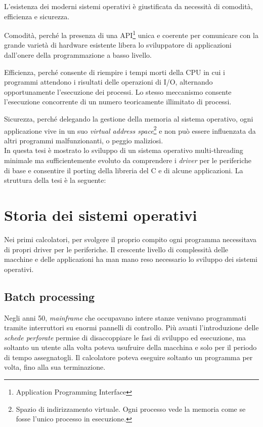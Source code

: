 \documentclass[12pt,a4paper]{report}
\begin{document}
	L'esistenza dei moderni sistemi operativi è giustificata da necessità di comodità, efficienza e sicurezza.
	
	Comodità, perché la presenza di una API\footnote{Application Programming Interface} unica e coerente per comunicare con
	la grande varietà di hardware esistente libera lo sviluppatore di applicazioni dall'onere della programmazione a basso livello.
	
	Efficienza, perché consente di riempire i tempi morti della CPU in cui i programmi attendono i risultati delle operazioni di I/O,
	alternando opportunamente l'esecuzione dei processi. Lo stesso meccanismo consente l'esecuzione concorrente di un
	numero teoricamente illimitato di processi.
	
	Sicurezza, perché delegando la gestione della memoria al sistema operativo, ogni applicazione vive in un suo
	\emph{virtual address space}\footnote{Spazio di indirizzamento virtuale. Ogni processo vede la memoria come se fosse
	l'unico processo in esecuzione.} e non può essere influenzata da altri programmi malfunzionanti, o peggio maliziosi.\\
	
	In questa tesi è mostrato lo sviluppo di un sistema operativo multi-threading minimale ma sufficientemente evoluto
	da comprendere i \emph{driver} per le periferiche di base e consentire il porting della libreria del C e di alcune applicazioni.
	La struttura della tesi è la seguente:


\chapter{Storia dei sistemi operativi}
	Nei primi calcolatori, per svolgere il proprio compito ogni programma necessitava di propri driver per le periferiche.
	Il crescente livello di complessità delle macchine e delle applicazioni ha man mano reso necessario lo sviluppo dei sistemi operativi.
	\section{Batch processing}
		Negli anni 50, \emph{mainframe} che occupavano intere stanze venivano programmati tramite interruttori su enormi pannelli di controllo.
		Più avanti l'introduzione delle \emph{schede perforate} permise di disaccoppiare le fasi di sviluppo
		ed esecuzione, ma soltanto un utente alla volta poteva usufruire della macchina e solo per il periodo di tempo assegnatogli.
		Il calcolatore poteva eseguire soltanto un programma per volta, fino alla sua terminazione.
		
\end{document}

